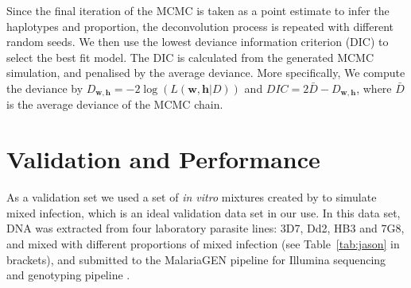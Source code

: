 \documentclass{bioinfo}
\begin{document}
\begin{itemize}
Since the final iteration of the MCMC is taken as a point estimate to infer the haplotypes and proportion, the deconvolution process is repeated with different random seeds. We then use the lowest deviance information criterion (DIC) to select the best fit model. The DIC is calculated from the generated MCMC simulation, and penalised by the average deviance. More specifically, We compute the deviance by $ D_{\mathbf{w}, \mathbf{h}} = -2 \log( L (\mathbf{w}, \mathbf{h}|D) )$ and $DIC = 2\bar{D} - D_{\mathbf{w}, \mathbf{h}}$, where $\bar{D}$ is the average deviance of the MCMC chain.



\end{itemize}



\section{Validation and Performance}
As a validation set we used a set of {\it in vitro} mixtures created by \citet{Wendler2015} to simulate mixed infection, which is an ideal validation data set in our use. In this data set, DNA was extracted from four laboratory parasite lines: 3D7, Dd2, HB3 and 7G8, and mixed with different proportions of mixed infection (see Table~\ref{tab:jason} in brackets), and submitted to the MalariaGEN pipeline \citep{MalariaGen2008} for Illumina sequencing and genotyping pipeline \citep{Menske2012}.
\end{document}
